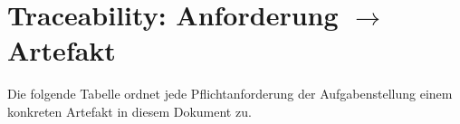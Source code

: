 \clearpage %
\section{Traceability: Anforderung \texorpdfstring{$\to$}{->} Artefakt}
\label{sec:traceability}

Die folgende Tabelle ordnet jede Pflichtanforderung der Aufgabenstellung
einem konkreten Artefakt in diesem Dokument zu.

\vspace{1em} %

\renewcommand{\arraystretch}{1.4}
